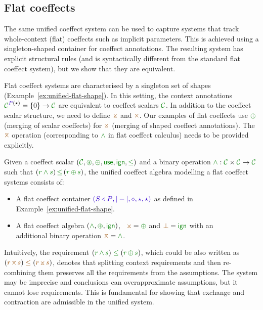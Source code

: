 
\subsection{Flat coeffects}
\label{sec:unified-flat}

The same unified coeffect system can be used to capture systems that track whole-context (flat) 
coeffects such as implicit parameters. This is achieved using a singleton-shaped container for
coeffect annotations. The resulting system has explicit structural rules (and is syntactically
different from the standard flat coeffect system), but we show that they are equivalent.

Flat coeffect systems are characterised by a singleton set of shapes (Example~\ref{ex:unified-flat-shape}).
In this setting, the context annotations $\C^{ \SP(\sflat) } = \{0\} \rightarrow \C$ are equivalent 
to coeffect scalars $\C$. In addition to the coeffect scalar structure, we need to define $\apar$ 
and $\azip$. Our examples of flat coeffects use $\cpar$ (merging of scalar coeffects) for $\apar$ 
(merging of shaped coeffect annotations). The $\azip$ operation (corresponding to $\czip$
in flat coeffect calculus) needs to be provided explicitly.

\begin{definition}
\label{def:unified-flat}
Given a coeffect scalar $(\C, \cseq, \cpar, \cunit, \czero, \cleq)$ and a binary operation 
$\cclrd{\wedge} : \C \times \C \rightarrow \C$ such that $(\cclrd{r \wedge s}) \,\cleq\, (\cclrd{r}\,\cpar\,\cclrd{s})$, 
the unified coeffect algebra modelling a flat coeffect systems consists of:
%
\begin{itemize}{}
\item A flat coeffect container $\sclrd{(\SHP, {|}-{|}, \diamond, \sflat, \sflat)}$ as defined in 
  Example~\ref{ex:unified-flat-shape}.

\item A flat coeffect algebra $(\czip, \cpar, \czero)$, \ie~$\apar = \cpar$ 
  and $\azero = \czero$ with an\\ additional binary operation $\azip = \czip$. 
\end{itemize}
\end{definition}

\noindent
Intuitively, the requirement $(\cclrd{r}\,\czip\,\cclrd{s}) \;\cleq\; (\cclrd{r}\,\cpar\,\cclrd{s})$,
which could be also written as $(\aclrd{r}\,\azip\,\aclrd{s}) \;\aclrd{\leq}\; (\aclrd{r}\,\apar\,\aclrd{s})$,
denotes that splitting context requirements and then re-combining them preserves all the requirements
from the assumptions. The system may be imprecise and conclusions can overapproximate assumptions, but
it cannot lose requirements. This is fundamental for showing that exchange and contraction are admissible
in the unified system. 

